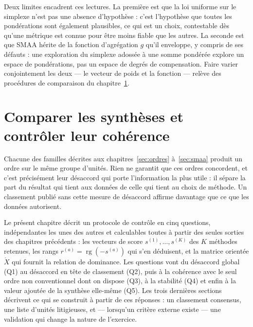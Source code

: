 \documentclass[11pt,a4paper]{article}
\theoremstyle{definition}
\theoremstyle{remark}
\newcommand{\Xor}{\mathring{X}}
\newcommand{\rg}{\operatorname{rg}}
\begin{document}
\bigskip

Deux limites encadrent ces lectures. La première est que la loi uniforme sur le simplexe
n'est pas une absence d'hypothèse : c'est l'hypothèse que toutes les pondérations sont
également plausibles, ce qui est un choix, contestable dès qu'une métrique est connue pour
être moins fiable que les autres. La seconde est que SMAA hérite de la fonction
d'agrégation $g$ qu'il enveloppe, y compris de ses défauts : une exploration du simplexe
adossée à une somme pondérée explore un espace de pondérations, pas un espace de degrés de
compensation. Faire varier conjointement les deux --- le vecteur de poids et la fonction
--- relève des procédures de comparaison du chapitre~\ref{sec:comparer}.

\section{Comparer les synthèses et contrôler leur cohérence}
\label{sec:comparer}

\medskip

Chacune des familles décrites aux chapitres~\ref{sec:ordres} à~\ref{sec:smaa} produit un
ordre sur le même groupe d'unités. Rien ne garantit que ces ordres concordent, et c'est
précisément leur désaccord qui porte l'information la plus utile : il sépare la part du
résultat qui tient aux données de celle qui tient au choix de méthode. Un classement
publié sans cette mesure de désaccord affirme davantage que ce que les données autorisent.

\medskip

Le présent chapitre décrit un protocole de contrôle en cinq questions, indépendantes les
unes des autres et calculables toutes à partir des seules sorties des chapitres
précédents : les vecteurs de score $s^{(1)},\dots,s^{(K)}$ des $K$ méthodes retenues, les
rangs $r^{(a)} = \rg(-s^{(a)})$ qui s'en déduisent, et la matrice orientée $\Xor$ qui
fournit la relation de dominance. Les questions vont du désaccord global (Q1) au désaccord
en tête de classement (Q2), puis à la cohérence avec le seul ordre non conventionnel dont
on dispose (Q3), à la stabilité (Q4) et enfin à la valeur ajoutée de la synthèse
elle-même (Q5). Les trois dernières sections décrivent ce qui se construit à partir de ces
réponses : un classement consensus, une liste d'unités litigieuses, et --- lorsqu'un
critère externe existe --- une validation qui change la nature de l'exercice.
\end{document}
